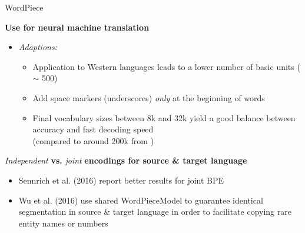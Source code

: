 \documentclass[]{beamer}
\begin{document}
\begin{frame}{WordPiece}

	\textbf{Use for neural machine translation \href{https://arxiv.org/pdf/1609.08144.pdf}{}}

	\begin{itemize}
		\item \textit{Adaptions:} 
			\begin{itemize}
				\item Application to Western languages leads to a lower number of basic units ($\sim$ 500)
				\item Add space markers (underscores) \textit{only} at the beginning of words
				\item Final vocabulary sizes between 8k and 32k yield a good balance between accuracy and fast decoding speed\\(compared to around 200k from \href{https://storage.googleapis.com/pub-tools-public-publication-data/pdf/37842.pdf}{})
			\end{itemize}
	\end{itemize}
	
	\vspace{.3cm}
	
	\textit{Independent} \textbf{vs.} \textit{joint} \textbf{encodings for source \& target language}
	
	\begin{itemize}
		\item Sennrich et al. (2016) report better results for joint BPE
		\item Wu et al. (2016) use shared WordPieceModel to guarantee identical segmentation in source \& target language in order to facilitate copying rare entity names or numbers
	\end{itemize}
\end{frame}
\end{document}
